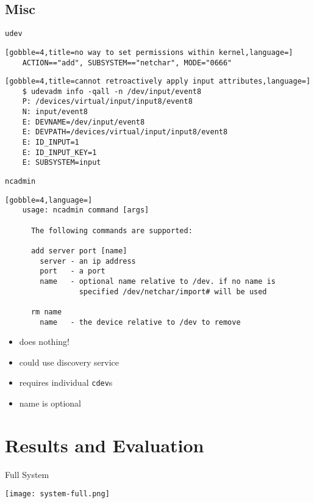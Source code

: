 \documentclass[handout]{beamer}
\begin{document}
\subsection{Misc}

\begin{frame}[t,fragile]{\texttt{udev}}
  \begin{lstlisting}[gobble=4,title=no way to set permissions within kernel,language=]
    ACTION=="add", SUBSYSTEM=="netchar", MODE="0666"
  \end{lstlisting}
  \begin{lstlisting}[gobble=4,title=cannot retroactively apply input attributes,language=]
    $ udevadm info -qall -n /dev/input/event8
    P: /devices/virtual/input/input8/event8
    N: input/event8
    E: DEVNAME=/dev/input/event8
    E: DEVPATH=/devices/virtual/input/input8/event8
    E: ID_INPUT=1
    E: ID_INPUT_KEY=1
    E: SUBSYSTEM=input
  \end{lstlisting}
\end{frame}

\begin{frame}[fragile]{\texttt{ncadmin}}
  \begin{lstlisting}[gobble=4,language=]
    usage: ncadmin command [args]

      The following commands are supported:

      add server port [name]
        server - an ip address
        port   - a port
        name   - optional name relative to /dev. if no name is
                 specified /dev/netchar/import# will be used

      rm name
        name   - the device relative to /dev to remove
  \end{lstlisting}
  \begin{itemize}
    \item<2-> does nothing!
    \item<3-> could use discovery service
    \item<4-> requires individual \texttt{cdev}s
    \item<5-> name is optional
  \end{itemize}
\end{frame}



\section{Results and Evaluation}
\begin{frame}[c]{Full System}
  \begin{center}
    \texttt{[image: system-full.png]}
  \end{center}
\end{frame}
\end{document}
